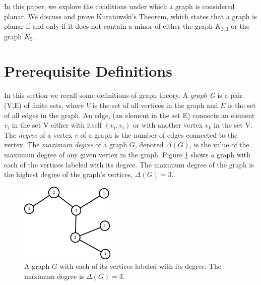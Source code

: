 In this paper, we explore the conditions under which a graph is considered planar. We discuss and prove Kuratowski's Theorem, which states that a graph is planar if and only if it does not contain a minor of either the graph $K_{3,3}$ or the graph $K_5$.

\section{Prerequisite Definitions}  
In this section we recall some definitions of graph theory. A \emph{graph G} is a pair (V,E) of finite sets, where $V$ is the set of all vertices in the graph and $E$ is the set of all edges in the graph. An edge, (an element in the set E) connects an element $v_i$ in the set V either with itself $(v_i,v_i)$ or with another vertex $v_k$ in the set V. The \emph{degree} of a vertex $v$ of a graph is the number of edges connected to the vertex. The \emph{maximum degree} of a graph $G$, denoted $\Delta(G)$, is the value of the maximum degree of any given vertex in the graph. Figure \ref{degree} shows a graph with each of the vertices labeled with its degree. The maximum degree of the graph is the highest degree of the graph's vertices, $\Delta(G) = 3$. 
\begin{figure}[htbp]
	\centering
\includegraphics[height=1.5in]{degree.eps}
\caption{A graph $G$ with each of its vertices labeled with its degree. The maximum degree is $\Delta(G) = 3$.}
\label{degree}
\end{figure}


